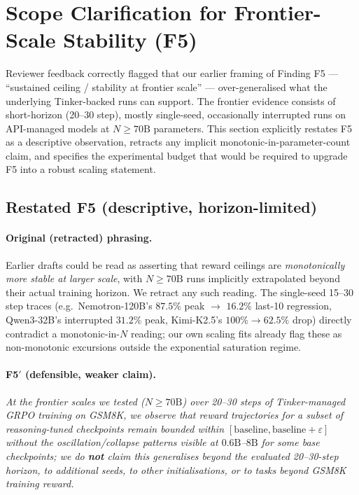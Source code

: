 \section{Scope Clarification for Frontier-Scale Stability (F5)}
\label{sec:frontier_scope}

Reviewer feedback correctly flagged that our earlier framing of Finding F5 ---
``sustained ceiling / stability at frontier scale'' --- over-generalised what
the underlying Tinker-backed runs can support. The frontier evidence consists
of short-horizon (20--30 step), mostly single-seed, occasionally interrupted
runs on API-managed models at $N\geq 70\mathrm{B}$ parameters. This section
explicitly restates F5 as a descriptive observation, retracts any implicit
monotonic-in-parameter-count claim, and specifies the experimental budget that
would be required to upgrade F5 into a robust scaling statement.

\subsection{Restated F5 (descriptive, horizon-limited)}

\paragraph{Original (retracted) phrasing.}
Earlier drafts could be read as asserting that reward ceilings are
\emph{monotonically more stable at larger scale}, with $N\geq 70\mathrm{B}$
runs implicitly extrapolated beyond their actual training horizon. We retract
any such reading. The single-seed 15--30 step traces (e.g.\ Nemotron-120B's
$87.5\%$ peak $\to$ $16.2\%$ last-10 regression, Qwen3-32B's interrupted
$31.2\%$ peak, Kimi-K2.5's $100\% \to 62.5\%$ drop) directly contradict a
monotonic-in-$N$ reading; our own scaling fits already flag these as
non-monotonic excursions outside the exponential saturation regime.

\paragraph{F5$'$ (defensible, weaker claim).}
\emph{At the frontier scales we tested ($N\geq 70\mathrm{B}$) over 20--30 steps
of Tinker-managed GRPO training on GSM8K, we observe that reward trajectories
for a subset of reasoning-tuned checkpoints remain bounded within
$[\mathrm{baseline}, \mathrm{baseline}+\varepsilon]$ without the
oscillation/collapse patterns visible at $0.6\mathrm{B}$--$8\mathrm{B}$ for
some base checkpoints; we do \textbf{not} claim this generalises beyond the
evaluated 20--30-step horizon, to additional seeds, to other initialisations,
or to tasks beyond GSM8K training reward.}

